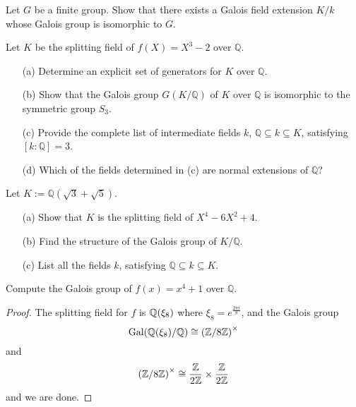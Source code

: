 \begin{prob}[F2000-Q4]
    Let \(G\) be a finite group. Show that there exists a Galois field extension \(K/k\) whose Galois group is isomorphic to \(G\).
\end{prob}

\begin{prob}[S2001-Q2]
    Let \(K\) be the splitting field of \(f(X)=X^3-2\) over \(\mathbb{Q}\).
    \begin{itemize}
        \item[(a)] Determine an explicit set of generators for \(K\) over \(\mathbb{Q}\).
        \item[(b)] Show that the Galois group \(G(K/\mathbb{Q})\) of \(K\) over \(\mathbb{Q}\) is isomorphic to the symmetric group \(S_3\).
        \item[(c)] Provide the complete list of intermediate fields \(k\), \(\mathbb{Q} \subseteq k \subseteq K\), satisfying \([k:\mathbb{Q}]=3\).
        \item[(d)] Which of the fields determined in (c) are normal extensions of \(\mathbb{Q}\)?
    \end{itemize}
\end{prob}


\begin{prob}[F2001-Q4]
    Let \(K:=\mathbb{Q}(\sqrt{3}+\sqrt{5})\).
    \begin{itemize}
        \item[(a)] Show that \(K\) is the splitting field of \(X^4-6X^2+4\).
        \item[(b)] Find the structure of the Galois group of \(K/\mathbb{Q}\).
        \item[(c)] List all the fields \(k\), satisfying \(\mathbb{Q} \subseteq k \subseteq K\).
    \end{itemize}
\end{prob}



\begin{prob}[F2013-Q5]
    Compute the Galois group of \(f(x) = x^4 + 1\) over \(\mathbb{Q}\).
\end{prob}
\begin{proof}
    The splitting field for $f$ is $\mathbb{Q}(\xi_8)$ where $\xi_8=e^\frac{2\pi i}{8}$, and the Galois group 
    \begin{equation*}
        \text{Gal}(\mathbb{Q}(\xi_8)/\mathbb{Q})\cong\left(\mathbb{Z}/8\mathbb{Z}\right)^\times
    \end{equation*}
    and
    \begin{equation*}
        \left(\mathbb{Z}/8\mathbb{Z}\right)^\times\cong\frac{\mathbb{Z}}{2\mathbb{Z}}\times\frac{\mathbb{Z}}{2\mathbb{Z}}
    \end{equation*}
    and we are done.
\end{proof}




